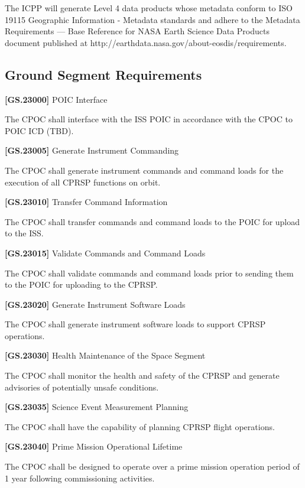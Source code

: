 \documentclass[12pt,oneside,oldfontcommands]{memoir}
\begin{document}
The \gls{ICPP} will generate Level 4 data products whose metadata conform to ISO 19115 Geographic Information - Metadata standards and adhere to the Metadata Requirements --- Base Reference for NASA Earth Science Data Products document published at http:\slash \slash earthdata.nasa.gov\slash about-eosdis\slash requirements.

\subsection{Ground Segment Requirements}
\label{groundsegmentrequirements}

\textbf{[GS.23000]} \gls{POIC} Interface

The \gls{CPOC} shall interface with the \gls{ISS} \gls{POIC} in accordance with the \gls{CPOC} to \gls{POIC} ICD (TBD).

\label{tbx_1}

\textbf{[GS.23005]} Generate Instrument Commanding

The \gls{CPOC} shall generate instrument commands and command loads for the execution of all \gls{CPRSP} functions on orbit.

\textbf{[GS.23010]} Transfer Command Information

The \gls{CPOC} shall transfer commands and command loads to the \gls{POIC} for upload to the \gls{ISS}.

\textbf{[GS.23015]} Validate Commands and Command Loads

The \gls{CPOC} shall validate commands and command loads prior to sending them to the \gls{POIC} for uploading to the \gls{CPRSP}.

\textbf{[GS.23020]} Generate Instrument Software Loads

The \gls{CPOC} shall generate instrument software loads to support \gls{CPRSP} operations.

\textbf{[GS.23030]} Health Maintenance of the Space Segment

The \gls{CPOC} shall monitor the health and safety of the \gls{CPRSP} and generate advisories of potentially unsafe conditions.

\textbf{[GS.23035]} Science Event Measurement Planning

The \gls{CPOC} shall have the capability of planning \gls{CPRSP} flight operations.

\textbf{[GS.23040]} Prime Mission Operational Lifetime

The \gls{CPOC} shall be designed to operate over a prime mission operation period of 1 year following commissioning activities.
\end{document}
